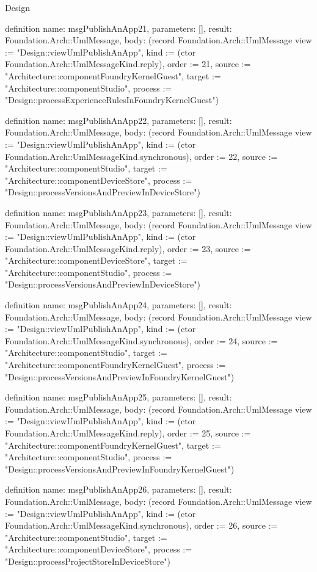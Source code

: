 \begin{lexlean}{Design}
\begin{semanticmodule}
definition{
  name: msgPublishAnApp21,
  parameters: [],
  result: Foundation.Arch::UmlMessage,
  body: (record Foundation.Arch::UmlMessage {view := "Design::viewUmlPublishAnApp", kind := (ctor Foundation.Arch::UmlMessageKind.reply), order := 21, source := "Architecture::componentFoundryKernelGuest", target := "Architecture::componentStudio", process := "Design::processExperienceRulesInFoundryKernelGuest"})
}

definition{
  name: msgPublishAnApp22,
  parameters: [],
  result: Foundation.Arch::UmlMessage,
  body: (record Foundation.Arch::UmlMessage {view := "Design::viewUmlPublishAnApp", kind := (ctor Foundation.Arch::UmlMessageKind.synchronous), order := 22, source := "Architecture::componentStudio", target := "Architecture::componentDeviceStore", process := "Design::processVersionsAndPreviewInDeviceStore"})
}

definition{
  name: msgPublishAnApp23,
  parameters: [],
  result: Foundation.Arch::UmlMessage,
  body: (record Foundation.Arch::UmlMessage {view := "Design::viewUmlPublishAnApp", kind := (ctor Foundation.Arch::UmlMessageKind.reply), order := 23, source := "Architecture::componentDeviceStore", target := "Architecture::componentStudio", process := "Design::processVersionsAndPreviewInDeviceStore"})
}

definition{
  name: msgPublishAnApp24,
  parameters: [],
  result: Foundation.Arch::UmlMessage,
  body: (record Foundation.Arch::UmlMessage {view := "Design::viewUmlPublishAnApp", kind := (ctor Foundation.Arch::UmlMessageKind.synchronous), order := 24, source := "Architecture::componentStudio", target := "Architecture::componentFoundryKernelGuest", process := "Design::processVersionsAndPreviewInFoundryKernelGuest"})
}

definition{
  name: msgPublishAnApp25,
  parameters: [],
  result: Foundation.Arch::UmlMessage,
  body: (record Foundation.Arch::UmlMessage {view := "Design::viewUmlPublishAnApp", kind := (ctor Foundation.Arch::UmlMessageKind.reply), order := 25, source := "Architecture::componentFoundryKernelGuest", target := "Architecture::componentStudio", process := "Design::processVersionsAndPreviewInFoundryKernelGuest"})
}

definition{
  name: msgPublishAnApp26,
  parameters: [],
  result: Foundation.Arch::UmlMessage,
  body: (record Foundation.Arch::UmlMessage {view := "Design::viewUmlPublishAnApp", kind := (ctor Foundation.Arch::UmlMessageKind.synchronous), order := 26, source := "Architecture::componentStudio", target := "Architecture::componentDeviceStore", process := "Design::processProjectStoreInDeviceStore"})
}


\end{semanticmodule}
\end{lexlean}
